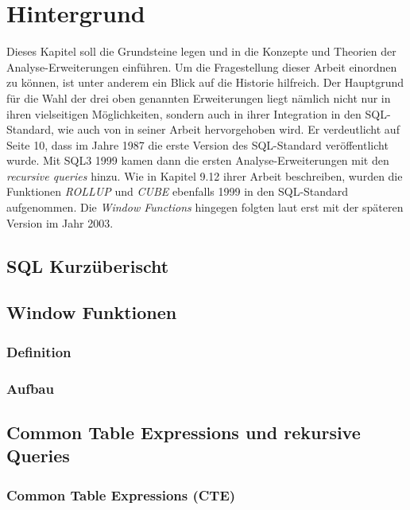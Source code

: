 \chapter{Hintergrund}
Dieses Kapitel soll die Grundsteine legen und in die Konzepte und Theorien
der Analyse-Erweiterungen einführen. Um die Fragestellung dieser Arbeit einordnen zu
können, ist unter anderem  ein Blick auf die Historie hilfreich. Der Hauptgrund für
die Wahl der drei oben genannten Erweiterungen liegt nämlich nicht nur in ihren vielseitigen
Möglichkeiten, sondern auch in ihrer Integration in den SQL-Standard, wie auch von
\cite{grust2017advanced} in seiner Arbeit hervorgehoben wird. Er verdeutlicht auf Seite 10,
dass im Jahre 1987 die erste Version des SQL-Standard veröffentlicht wurde. Mit SQL3 1999
kamen dann die ersten Analyse-Erweiterungen mit den \textit{recursive queries} hinzu.
Wie \cite{melton2001sql} in Kapitel 9.12 ihrer Arbeit beschreiben, wurden die Funktionen
\textit{ROLLUP} und \textit{CUBE} ebenfalls 1999 in den SQL-Standard aufgenommen.
Die \textit{Window Functions} hingegen folgten laut \cite{grust2017advanced} erst
mit der späteren Version im Jahr 2003.









\section{SQL Kurzüberischt}

\section{Window Funktionen}

\subsection{Definition}

\subsection{Aufbau}

\section{Common Table Expressions und rekursive Queries}

\subsection{Common Table Expressions (CTE)}


